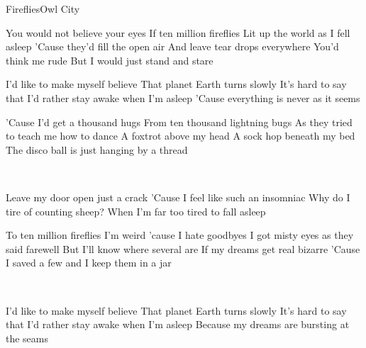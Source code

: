 \begin{Song}{Fireflies}{Owl City}

\begin{multicols}{2}
\begin{Verse}
You would not believe your eyes
If ten million fireflies
Lit up the world as I fell asleep
'Cause they'd fill the open air
And leave tear drops everywhere
You'd think me rude
But I would just stand and stare
\end{Verse}
\espaceInterStrophe

\begin{Chorus}
I'd like to make myself believe
That planet Earth turns slowly
It's hard to say that I'd rather stay awake when I'm asleep
'Cause everything is never as it seems
\end{Chorus}
\espaceInterStrophe

\begin{Verse}
'Cause I'd get a thousand hugs
From ten thousand lightning bugs
As they tried to teach me how to dance
A foxtrot above my head
A sock hop beneath my bed
The disco ball is just hanging by a thread
\end{Verse}
\espaceInterStrophe

\tochorus\\
\vfill
\columnbreak

\begin{Bridge}
Leave my door open just a crack
'Cause I feel like such an insomniac
Why do I tire of counting sheep?
When I'm far too tired to fall asleep
\end{Bridge}
\espaceInterStrophe

\begin{Verse}
To ten million fireflies
I'm weird 'cause I hate goodbyes
I got misty eyes as they said farewell
But I'll know where several are
If my dreams get real bizarre
'Cause I saved a few and I keep them in a jar
\end{Verse}
\espaceInterStrophe

\tochorus[x2]\\
\espaceInterStrophe

\begin{Chorus}
I'd like to make myself believe
That planet Earth turns slowly
It's hard to say that I'd rather stay awake when I'm asleep
Because my dreams are bursting at the seams
\end{Chorus}
\espaceInterStrophe
\end{multicols}
\vfill


\end{Song}
